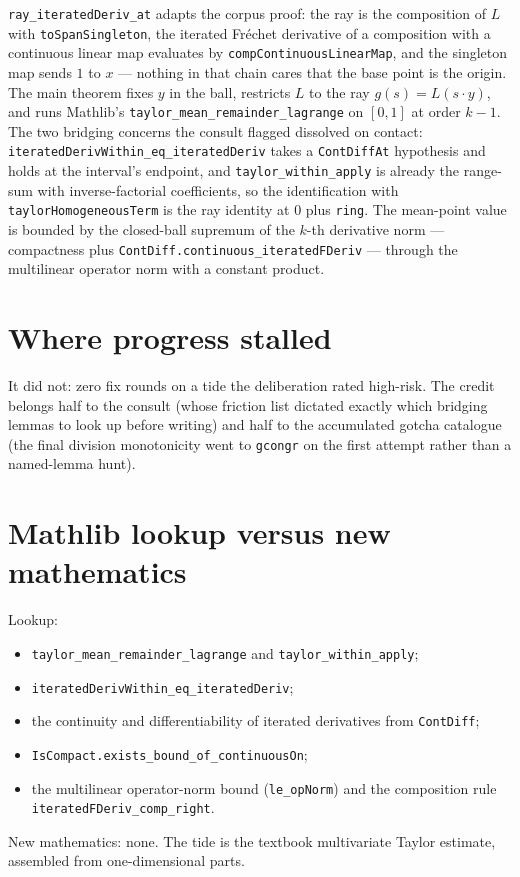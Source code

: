 \documentclass[11pt]{article}
\newcommand{\code}[1]{\texttt{#1}}
\begin{document}
\begin{sloppypar}
\code{ray\_iteratedDeriv\_at} adapts the corpus proof: the ray is
the composition of $L$ with \code{toSpanSingleton}, the iterated
Fr\'echet derivative of a composition with a continuous linear map
evaluates by \code{compContinuousLinearMap}, and the singleton map
sends $1$ to $x$ --- nothing in that chain cares that the base point
is the origin. The main theorem fixes $y$ in the ball, restricts $L$
to the ray $g(s) = L(s \cdot y)$, and runs Mathlib's
\code{taylor\_mean\_remainder\_lagrange} on $[0,1]$ at order
$k - 1$. The two bridging concerns the consult flagged dissolved on
contact: \code{iteratedDerivWithin\_eq\_iteratedDeriv} takes a
\code{ContDiffAt} hypothesis and holds at the interval's endpoint,
and \code{taylor\_within\_apply} is already the range-sum with
inverse-factorial coefficients, so the identification with
\code{taylorHomogeneousTerm} is the ray identity at $0$ plus
\code{ring}. The mean-point value is bounded by the closed-ball
supremum of the $k$-th derivative norm --- compactness plus
\code{ContDiff.continuous\_iteratedFDeriv} --- through the
multilinear operator norm with a constant product.
\end{sloppypar}

\section{Where progress stalled}

It did not: zero fix rounds on a tide the deliberation rated
high-risk. The credit belongs half to the consult (whose friction
list dictated exactly which bridging lemmas to look up before
writing) and half to the accumulated gotcha catalogue (the final
division monotonicity went to \code{gcongr} on the first attempt
rather than a named-lemma hunt).

\section{Mathlib lookup versus new mathematics}

Lookup:
\begin{itemize}
\item \code{taylor\_mean\_remainder\_lagrange} and
  \code{taylor\_within\_apply};
\item \code{iteratedDerivWithin\_eq\_iteratedDeriv};
\item the continuity and differentiability of iterated derivatives
  from \code{ContDiff};
\item \code{IsCompact.exists\_bound\_of\_continuousOn};
\item the multilinear operator-norm bound (\code{le\_opNorm}) and
  the composition rule
  \code{iteratedFDeriv\_comp\_right}.
\end{itemize}
New mathematics: none. The tide is the textbook multivariate Taylor
estimate, assembled from one-dimensional parts.
\end{document}
